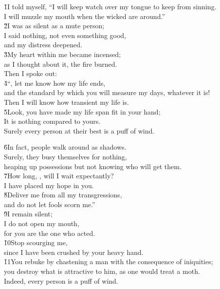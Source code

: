 \begin{poetry}
\poeml \v{1}I told myself, ``I will keep watch over my tongue to keep from sinning. \\
\poemll    I will muzzle my mouth when the wicked are around.'' \\
\poeml \v{2}I was as silent as a mute person; \\
\poemll    I said nothing, not even something good, \\
\poemlll       and my distress deepened. \\
\poeml \v{3}My heart within me became incensed; \\
\poemll    as I thought about it, the fire burned. \\
\poeml Then I spoke out: \\
\poeml \v{4}``, let me know how my life ends, \\
\poemll    and the standard by which you will measure my days, whatever it is! \\
\poemlll       Then I will know how transient my life is. \\
\poeml \v{5}Look, you have made my life span fit in your hand; \\
\poemll    It is nothing compared to yours. \\
\poemlll       Surely every person at their best is a puff of wind.
\end{poetry}

\begin{poetry}
\poeml \v{6}In fact, people walk around as shadows. \\
\poemll    Surely, they busy themselves for nothing, \\
\poemlll       heaping up possessions but not knowing who will get them. \\
\poeml \v{7}How long, , will I wait expectantly? \\
\poemll    I have placed my hope in you. \\
\poeml \v{8}Deliver me from all my transgressions, \\
\poemll    and do not let fools scorn me.'' \\
\poeml \v{9}I remain silent; \\
\poemll    I do not open my mouth, \\
\poemlll       for you are the one who acted. \\
\poeml \v{10}Stop scourging me, \\
\poemll    since I have been crushed by your heavy hand. \\
\poeml \v{11}You rebuke by chastening a man with the consequence of iniquities; \\
\poemll    you destroy what is attractive to him, as one would treat a moth. \\
\poemlll       Indeed, every person is a puff of wind.
\end{poetry}

